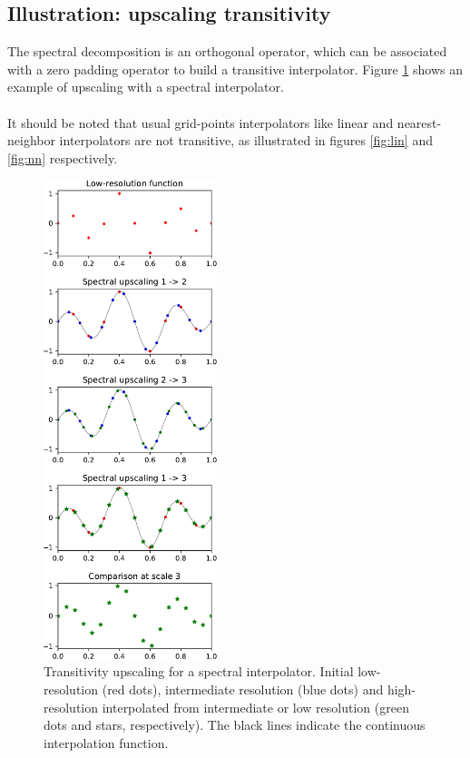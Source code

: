 \documentclass[12pt]{scrartcl}
\begin{document}
\subsection{Illustration: upscaling transitivity}
The spectral decomposition is an orthogonal operator, which can be associated with a zero padding operator to build a transitive interpolator. Figure \ref{fig:sp} shows an example of upscaling with a spectral interpolator.\\
$  $\\
It should be noted that usual grid-points interpolators like linear and nearest-neighbor interpolators are not transitive, as illustrated in figures \ref{fig:lin} and \ref{fig:nn} respectively.

\begin{figure}[!h]
\begin{center}
\includegraphics[width=0.45\textwidth]{interpolation_comparison_sp.pdf}
\end{center}
\caption{\label{fig:sp} Transitivity upscaling for a spectral interpolator. Initial low-resolution (red dots), intermediate resolution (blue dots) and high-resolution interpolated from intermediate or low resolution (green dots and stars, respectively). The black lines indicate the continuous interpolation function.}
\end{figure}
\end{document}
